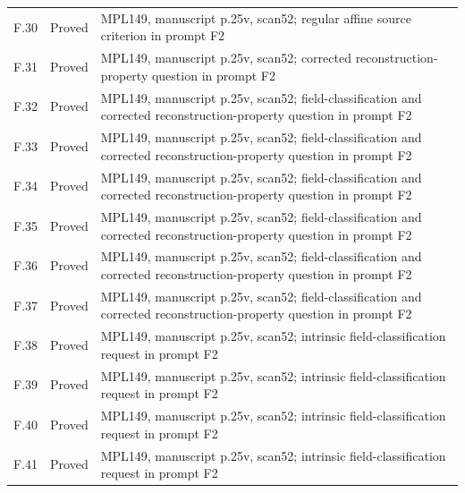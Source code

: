 {\begin{longtable}{p{1.9cm}p{1.7cm}p{10.3cm}}
F.30 & Proved & MPL149, manuscript p.25v, scan52; regular affine source criterion in prompt F2 \\
F.31 & Proved & MPL149, manuscript p.25v, scan52; corrected reconstruction-property question in prompt F2 \\
F.32 & Proved & MPL149, manuscript p.25v, scan52; field-classification and corrected reconstruction-property question in prompt F2 \\
F.33 & Proved & MPL149, manuscript p.25v, scan52; field-classification and corrected reconstruction-property question in prompt F2 \\
F.34 & Proved & MPL149, manuscript p.25v, scan52; field-classification and corrected reconstruction-property question in prompt F2 \\
F.35 & Proved & MPL149, manuscript p.25v, scan52; field-classification and corrected reconstruction-property question in prompt F2 \\
F.36 & Proved & MPL149, manuscript p.25v, scan52; field-classification and corrected reconstruction-property question in prompt F2 \\
F.37 & Proved & MPL149, manuscript p.25v, scan52; field-classification and corrected reconstruction-property question in prompt F2 \\
F.38 & Proved & MPL149, manuscript p.25v, scan52; intrinsic field-classification request in prompt F2 \\
F.39 & Proved & MPL149, manuscript p.25v, scan52; intrinsic field-classification request in prompt F2 \\
F.40 & Proved & MPL149, manuscript p.25v, scan52; intrinsic field-classification request in prompt F2 \\
F.41 & Proved & MPL149, manuscript p.25v, scan52; intrinsic field-classification request in prompt F2 \\
\bottomrule\end{longtable}
}
